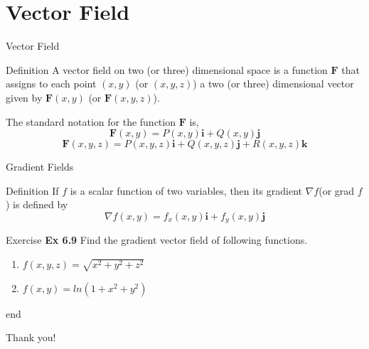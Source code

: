 \documentclass[aspectratio=169, UTF8]{ctexbeamer}
\begin{document}
\section{Vector Field}
    
\begin{frame}[label=3]{Vector Field}
    \begin{block}{Definition}
        A vector field on two (or three) dimensional space is a function $\boldsymbol{F}$ that assigns to each point $(x, y)$ (or $(x, y, z)$) a two (or three) dimensional vector given by $\boldsymbol{F}(x, y)$ (or $\boldsymbol{F}(x, y, z)$).
    \end{block}
    The standard notation for the function $\boldsymbol{F}$ is,
\[
\boldsymbol{F}(x, y) = P(x, y) \boldsymbol{i} + Q(x, y) \boldsymbol{j}
\]
\[
\boldsymbol{F}(x, y, z) = P(x, y, z) \boldsymbol{i} + Q(x, y, z) \boldsymbol{j} + R(x, y, z) \boldsymbol{k}
\]
\end{frame}
\begin{frame}{Gradient Fields}
\begin{block}{Definition}
    If $f$ is a scalar function of two variables, then its gradient $\nabla f$(or grad $f$) is defined by
    \begin{equation*}
        \nabla f(x,y)=f_x(x,y)\boldsymbol{i}+f_y(x,y)\boldsymbol{j}
    \end{equation*}
\end{block}
    
\end{frame}

\begin{frame}{Exercise}
    \textbf{Ex 6.9} Find the gradient vector field of following functions.
    \begin{enumerate}
        \item $f(x,y,z)=\sqrt{x^2+y^2+z^2}$
        \item $f(x,y)=ln(1+x^2+y^2)$
    \end{enumerate}
\end{frame}

\begin{frame}{\textcolor{green!30!black}{end}}
    \begin{center}
        \LARGE Thank you!
    \end{center}
\end{frame}
\end{document}
